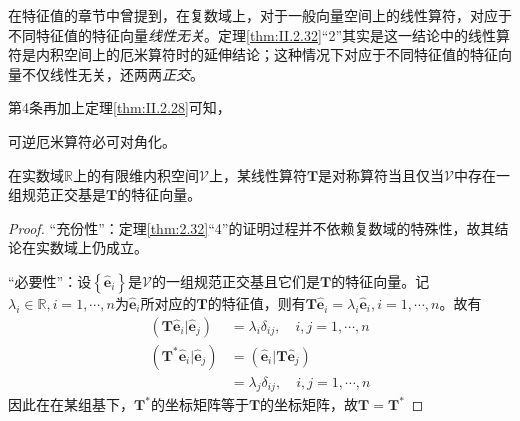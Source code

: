 \documentclass[main.tex]{subfiles}
\begin{document}
在特征值的章节中曾提到，在复数域上，对于一般向量空间上的线性算符，对应于不同特征值的特征向量\emph{线性无关}。定理\ref{thm:II.2.32}“2”其实是这一结论中的线性算符是内积空间上的厄米算符时的延伸结论；这种情况下对应于不同特征值的特征向量不仅线性无关，还两两\emph{正交}。

第4条再加上定理\ref{thm:II.2.28}可知，

\begin{corollary}可逆厄米算符必可对角化。\end{corollary}

\begin{corollary}
    在实数域$\mathbb{R}$上的有限维内积空间$\mathcal{V}$上，某线性算符$\mathbf{T}$是对称算符当且仅当$\mathcal{V}$中存在一组规范正交基是$\mathbf{T}$的特征向量。
\end{corollary}
\begin{proof}
    “充份性”：定理\ref{thm:2.32}“4”的证明过程并不依赖复数域的特殊性，故其结论在实数域上仍成立。

    “必要性”：设$\left\{\mathbf{\hat{e}}_i\right\}$是$\mathcal{V}$的一组规范正交基且它们是$\mathbf{T}$的特征向量。记$\lambda_i\in\mathbb{R},i=1,\cdots,n$为$\mathbf{\hat{e}}_i$所对应的$\mathbf{T}$的特征值，则有$\mathbf{T\hat{e}}_i=\lambda_i\mathbf{\hat{e}}_i,i=1,\cdots,n$。故有
    \begin{align*}
        \left(\mathbf{T\hat{e}}_i|\mathbf{\hat{e}}_j\right)            & =\lambda_i\delta_{ij},\quad i,j=1,\cdots,n           \\
        \left(\mathbf{T}^*\mathbf{\hat{e}}_i|\mathbf{\hat{e}}_j\right) & =\left(\mathbf{\hat{e}}_i|\mathbf{T\hat{e}}_j\right) \\
                                                                       & =\lambda_j\delta_{ij},\quad i,j=1,\cdots,n
    \end{align*}
    因此在在某组基下，$\mathbf{T}^*$的坐标矩阵等于$\mathbf{T}$的坐标矩阵，故$\mathbf{T}=\mathbf{T}^*$
\end{proof}
\end{document}
